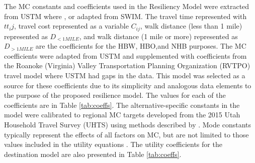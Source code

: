 The MC constants and coefficients used in the Resiliency Model were extracted
from USTM where
, or adapted from SWIM. The travel time represented with $tt_ij$, travel cost
represented as a variable $C_{ij}$, walk distance (less than 1 mile) represented
as $D_{<1MILE}$, and walk distance (1 mile or more) represented as $D_{>1MILE}$
are the coefficients for the
HBW, HBO,and NHB purposes. The MC coefficients were adapted
from USTM and supplemented with coefficients from the Roanoke (Virginia)
Valley Transportation Planning Organization (RVTPO) travel model where USTM had gaps in the data. This model was
selected as a source for these coefficients due to its simplicity and analogous data elements to the purpose of the proposed resilience model. The
values for each of the coefficients are in Table \ref{tab:coeffs}. The alternative-specific constants in the model were calibrated to regional MC
targets developed from the 2015 Utah Household Travel Survey (UHTS) using
methods described by \citet{koppelman2006}.
Mode constants typically represent the effects of all factors on MC, but are not limited to
those values included in the utility equations \citep{koppelman2006}. The utility coefficients for the destination model are
also presented in Table \ref{tab:coeffs}.

